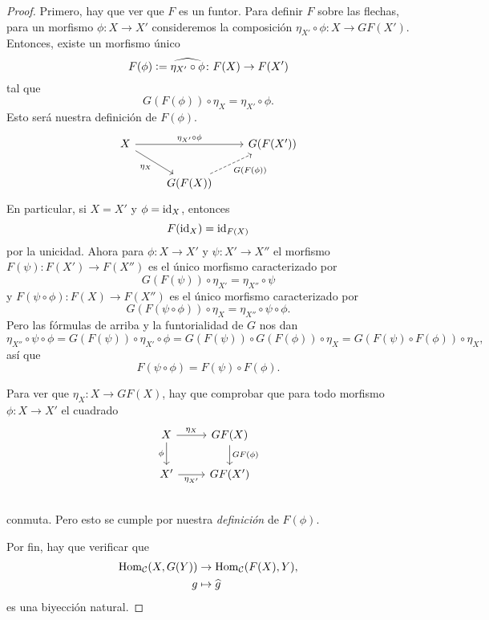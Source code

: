 \documentclass{article}
\numberwithin{equation}{section}
\theoremstyle{definition}
\begin{document}
\begin{proposicion}
\begin{proof}
    Primero, hay que ver que $F$ es un funtor. Para definir $F$ sobre las
    flechas, para un morfismo $\phi\colon X\to X'$ consideremos la composición
    $\eta_{X'}\circ \phi\colon X\to GF (X')$. Entonces, existe un morfismo único
    $$F (\phi) \mathrel{\mathop:}= \widehat{\eta_{X'}\circ \phi}\colon F(X) \to F (X')$$
    tal que
    $$G (F (\phi))\circ \eta_X = \eta_{X'}\circ \phi.$$
    Esto será nuestra definición de $F (\phi)$.
    \[ \begin{tikzcd}
        X \ar{rr}{\eta_{X'}\circ \phi}\ar{dr}[swap]{\eta_X} && G (F (X')) \\
        & G (F (X))\ar[dashed]{ur}[swap]{G (F (\phi))}
      \end{tikzcd} \]
    En particular, si $X = X'$ y $\phi = \mathrm{id}_{X}$, entonces
    $$F (\mathrm{id}_{X}) = \mathrm{id}_{F (X)}$$
    por la unicidad. Ahora para $\phi\colon X\to X'$ y $\psi\colon X'\to X''$ el
    morfismo $F (\psi)\colon F (X') \to F (X'')$ es el único morfismo
    caracterizado por
    $$G (F (\psi))\circ \eta_{X'} = \eta_{X''}\circ \psi$$
    y $F (\psi\circ\phi)\colon F(X) \to F (X'')$ es el único morfismo
    caracterizado por
    $$G (F (\psi\circ\phi))\circ \eta_{X} = \eta_{X''}\circ \psi\circ\phi.$$
    Pero las fórmulas de arriba y la funtorialidad de $G$ nos dan
    \[ \eta_{X''}\circ \psi\circ\phi =
       G (F (\psi))\circ \eta_{X'}\circ \phi =
       G (F (\psi))\circ G (F (\phi))\circ \eta_X =
       G (F (\psi)\circ F (\phi))\circ \eta_X, \]
    así que
    $$F (\psi\circ\phi) = F (\psi)\circ F (\phi).$$

    Para ver que $\eta_X\colon X\to GF (X)$, hay que comprobar que para todo
    morfismo $\phi\colon X\to X'$ el cuadrado
    \[ \begin{tikzcd}
        X \ar{r}{\eta_X}\ar{d}[swap]{\phi} & GF (X)\ar{d}{GF (\phi)} \\
        X' \ar{r}[swap]{\eta_{X'}} & GF (X') \\
      \end{tikzcd} \]
    conmuta. Pero esto se cumple por nuestra \emph{definición} de $F (\phi)$.

    Por fin, hay que verificar que
    \begin{align*}
      \operatorname{Hom}_\mathcal{C} (X, G (Y)) & \to \operatorname{Hom}_\mathcal{C} (F (X), Y),\\
      g & \mapsto \widehat{g}
    \end{align*}
    es una biyección natural.


\end{proof}
\end{proposicion}
\end{document}
